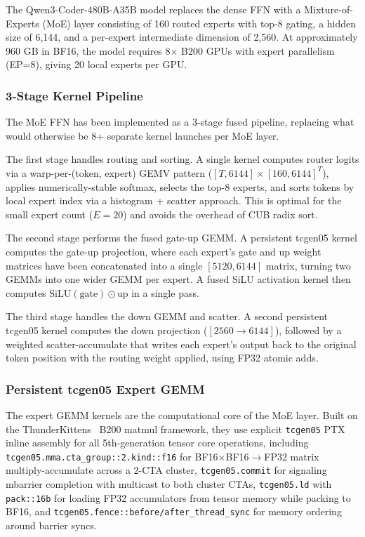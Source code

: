\documentclass[sigplan,screen]{acmart}
\begin{document}
The Qwen3-Coder-480B-A35B model replaces the dense FFN with a Mixture-of-Experts (MoE) layer consisting of 160 routed experts with top-8 gating, a hidden size of 6{,}144, and a per-expert intermediate dimension of 2{,}560. At approximately 960 GB in BF16, the model requires 8$\times$ B200 GPUs with expert parallelism (EP=8), giving 20 local experts per GPU.

\subsubsection{3-Stage Kernel Pipeline}

The MoE FFN has been implemented as a 3-stage fused pipeline, replacing what would otherwise be 8+ separate kernel launches per MoE layer.

The first stage handles routing and sorting. A single kernel computes router logits via a warp-per-(token, expert) GEMV pattern ($[T, 6144] \times [160, 6144]^T$), applies numerically-stable softmax, selects the top-8 experts, and sorts tokens by local expert index via a histogram + scatter approach. This is optimal for the small expert count ($E=20$) and avoids the overhead of CUB radix sort.

The second stage performs the fused gate-up GEMM. A persistent tcgen05 kernel computes the gate-up projection, where each expert's gate and up weight matrices have been concatenated into a single $[5120, 6144]$ matrix, turning two GEMMs into one wider GEMM per expert. A fused SiLU activation kernel then computes $\text{SiLU}(\text{gate}) \odot \text{up}$ in a single pass.

The third stage handles the down GEMM and scatter. A second persistent tcgen05 kernel computes the down projection ($[2560 \rightarrow 6144]$), followed by a weighted scatter-accumulate that writes each expert's output back to the original token position with the routing weight applied, using FP32 atomic adds.

\subsubsection{Persistent tcgen05 Expert GEMM}

The expert \newline GEMM kernels are the computational core of the MoE layer. Built on the ThunderKittens~\cite{thunderkittens} B200 matmul framework, they use explicit \texttt{tcgen05} PTX inline assembly for all 5th-generation tensor core operations, including \newline \texttt{tcgen05.mma.cta\_group::2.kind::f16} \newline for BF16$\times$BF16$\rightarrow$FP32 matrix multiply-accumulate across a 2-CTA cluster, \texttt{tcgen05.commit} for signaling mbarrier completion with multicast to both cluster CTAs, \texttt{tcgen05.ld} with \texttt{pack::16b} for loading FP32 accumulators from tensor memory while packing to BF16, and \newline \texttt{tcgen05.fence::before/after\_thread\_sync} for memory ordering around barrier syncs.
\end{document}
